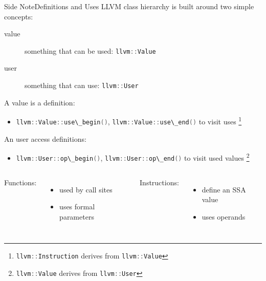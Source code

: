 \documentclass[10pt,mathserif]{beamer}
\newcommand{\cppinline}[1]{\lstinline[language=C++]!#1!}
\begin{document}
\begin{frame}{Side Note}{Definitions and Uses}
LLVM class hierarchy is built around two simple concepts:

\begin{description}
\item[value] something that can be used: \cppinline{llvm::Value}
\item[user] something that can use: \cppinline{llvm::User}
\end{description}

A value is a \alert{definition}:

\begin{itemize}
\item \cppinline{llvm::Value::use\_begin()},
      \cppinline{llvm::Value::use\_end()} to visit uses
      \footnote{\cppinline{llvm::Instruction} derives from \cppinline{llvm::Value}}
\end{itemize}

An user access \alert{definitions}:

\begin{itemize}
\item \cppinline{llvm::User::op\_begin()},
      \cppinline{llvm::User::op\_end()} to visit used values
      \footnote{\cppinline{llvm::Value} derives from \cppinline{llvm::User}}
\end{itemize}

\begin{columns}[t]
Functions:

\begin{itemize}
\item used by call sites
\item uses formal parameters
\end{itemize}

Instructions:

\begin{itemize}
\item define an SSA value
\item uses operands
\end{itemize}
\end{columns}
\end{frame}
\end{document}

